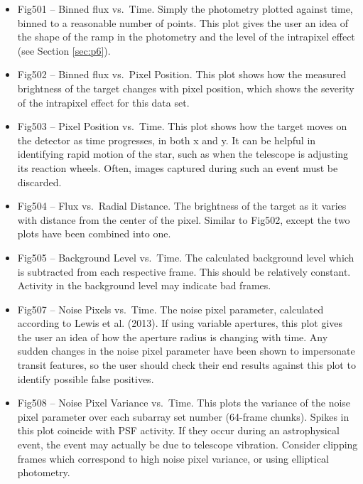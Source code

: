 \documentclass[letterpaper,12pt]{article}
\begin{document}
\begin{itemize}
\item Fig501 -- Binned flux vs.\ Time. Simply the photometry plotted against
  time, binned to a reasonable number of points. This plot gives the user
  an idea of the shape of the ramp in the photometry and the level of the
  intrapixel effect (see Section \ref{sec:p6}).

\item Fig502 -- Binned flux vs.\ Pixel Position. This plot shows how the
  measured brightness of the target changes with pixel position, which
  shows the severity of the intrapixel effect for this data set.

\item Fig503 -- Pixel Position vs.\ Time. This plot shows how the
  target moves on the detector as time progresses, in both x and y. It
  can be helpful in identifying rapid motion of the star, such as when
  the telescope is adjusting its reaction wheels. Often, images
  captured during such an event must be discarded.

\item Fig504 -- Flux vs.\ Radial Distance. The brightness of the target
  as it varies with distance from the center of the pixel. Similar to
  Fig502, except the two plots have been combined into one.

\item Fig505 -- Background Level vs.\ Time. The calculated background level
  which is subtracted from each respective frame. This should be relatively
  constant. Activity in the background level may indicate bad frames.

\item Fig507 -- Noise Pixels vs.\ Time. The noise pixel parameter, calculated
  according to Lewis et al. (2013). If using variable apertures, this plot
  gives the user an idea of how the aperture radius is changing with time.
  Any sudden changes in the noise pixel parameter have been shown to
  impersonate transit features, so the user should check their end results
  against this plot to identify possible false positives.

\item Fig508 -- Noise Pixel Variance vs.\ Time. This plots the variance
  of the noise pixel parameter over each subarray set number (64-frame
  chunks). Spikes in this plot coincide with PSF activity. If they occur
  during an astrophysical event, the event may actually be due to
  telescope vibration. Consider clipping frames which correspond
  to high noise pixel variance, or using elliptical photometry.


\end{itemize}
\end{document}
